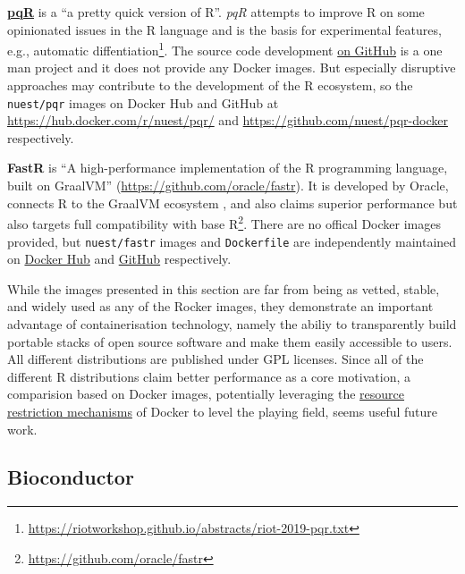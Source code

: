 \textbf{\href{http://www.pqr-project.org/}{pqR}} is a ``a pretty quick
version of R''. \emph{pqR} attempts to improve R on some opinionated
issues in the R language and is the basis for experimental features,
e.g., automatic
diffentiation\footnote{\href{https://riotworkshop.github.io/abstracts/riot-2019-pqr.txt}{https://riotworkshop.github.io/abstracts/riot-2019-pqr.txt}}.
The source code development
\href{https://github.com/radfordneal/pqR/}{on GitHub} is a one man
project and it does not provide any Docker images. But especially
disruptive approaches may contribute to the development of the R
ecosystem, so the \texttt{nuest/pqr} images on Docker Hub and GitHub at
\url{https://hub.docker.com/r/nuest/pqr/} and
\url{https://github.com/nuest/pqr-docker} respectively.

\textbf{FastR} is ``A high-performance implementation of the R
programming language, built on GraalVM''
(\url{https://github.com/oracle/fastr}). It is developed by Oracle,
connects R to the GraalVM ecosystem \citep{wikipedia_graalvm_2019}, and
also claims superior performance but also targets full compatibility
with base
R\footnote{\href{https://github.com/oracle/fastr}{https://github.com/oracle/fastr}}.
There are no offical Docker images provided, but \texttt{nuest/fastr}
images and \texttt{Dockerfile} are independently maintained on
\href{https://cloud.docker.com/repository/docker/nuest/fastr/}{Docker
Hub} and \href{https://github.com/nuest/fastr-docker}{GitHub}
respectively.

While the images presented in this section are far from being as vetted,
stable, and widely used as any of the Rocker images, they demonstrate an
important advantage of containerisation technology, namely the abiliy to
transparently build portable stacks of open source software and make
them easily accessible to users. All different distributions are
published under GPL licenses. Since all of the different R distributions
claim better performance as a core motivation, a comparision based on
Docker images, potentially leveraging the
\href{https://docs.docker.com/config/containers/resource_constraints/}{resource
restriction mechanisms} of Docker to level the playing field, seems
useful future work.

\hypertarget{bioconductor}{%
\subsection{Bioconductor}\label{bioconductor}}

\label{bioc}

